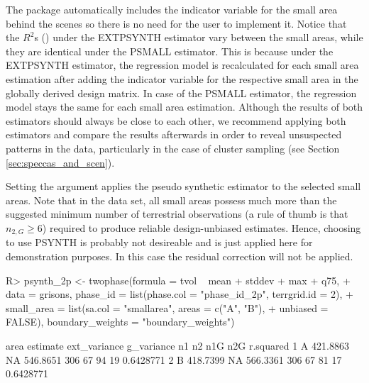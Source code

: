 \documentclass[article]{jss}
\begin{document}
The  package automatically includes the indicator variable for the small area behind the scenes so there is no need for the user to implement it. Notice that the $R^2$s () under the EXTPSYNTH estimator vary between the small areas, while they are identical under the PSMALL estimator. This is because under the EXTPSYNTH estimator, the regression model is recalculated for each small area estimation after adding the indicator variable for the respective small area in the globally derived design matrix. In case of the PSMALL estimator, the regression model stays the same for each small area estimation. Although the results of both estimators should always be close to each other, we recommend applying both estimators and compare the results afterwards in order to reveal unsuspected patterns in the data, particularly in the case of cluster sampling (see Section \ref{sec:speccas_and_scen}).\par

Setting the argument  applies the pseudo synthetic estimator to the selected small areas. Note that in the  data set, all small areas possess much more than the suggested minimum number of terrestrial observations (a rule of thumb is that $n_{2,G} \geq 6$) required to produce reliable design-unbiased estimates. Hence, choosing to use PSYNTH is probably not desireable and is just applied here for demonstration purposes. In this case the residual correction will not be applied.



\begin{Schunk}
\begin{Sinput}
R> psynth_2p <- twophase(formula = tvol ~ mean + stddev + max + q75, 
+    data = grisons, phase_id = list(phase.col = "phase_id_2p", terrgrid.id = 2),
+    small_area = list(sa.col = "smallarea", areas = c("A", "B"),
+    unbiased = FALSE), boundary_weights = "boundary_weights")
\end{Sinput}
\end{Schunk}



\begin{Schunk}
\begin{Soutput}
  area estimate ext_variance g_variance  n1 n2 n1G n2G r.squared
1    A 421.8863           NA   546.8651 306 67  94  19 0.6428771
2    B 418.7399           NA   566.3361 306 67  81  17 0.6428771
\end{Soutput}
\end{Schunk}
\end{document}

